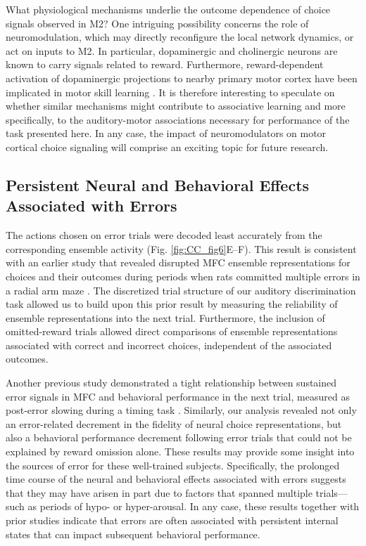 What physiological mechanisms underlie the outcome dependence of choice signals observed in M2? One intriguing possibility concerns the role of neuromodulation, which may directly reconfigure the local network dynamics, or act on inputs to M2. In particular, dopaminergic \citep{schultz1997neural} and cholinergic \citep{hangya2015central} neurons are known to carry signals related to reward. Furthermore, reward-dependent activation of dopaminergic projections to nearby primary motor cortex have been implicated in motor skill learning \citep{hosp2011dopaminergic, leemburg2018motor}. It is therefore interesting to speculate on whether similar mechanisms might contribute to associative learning \citep{takehara2008spontaneous} and more specifically, to the auditory-motor associations necessary for performance of the task presented here. In any case, the impact of neuromodulators on motor cortical choice signaling will comprise an exciting topic for future research.

\subsection*{Persistent Neural and Behavioral Effects Associated with Errors}
The actions chosen on error trials were decoded least accurately from the corresponding ensemble activity (Fig. \ref{fig:CC_fig6}E--F). This result is consistent with an earlier study that revealed disrupted MFC ensemble representations for choices and their outcomes during periods when rats committed multiple errors in a radial arm maze \citep{lapish2008successful, hyman2012action}. The discretized trial structure of our auditory discrimination task allowed us to build upon this prior result by measuring the reliability of ensemble representations into the next trial. Furthermore, the inclusion of omitted-reward trials allowed direct comparisons of ensemble representations associated with correct and incorrect choices, independent of the associated outcomes.

Another previous study demonstrated a tight relationship between sustained error signals in MFC and behavioral performance in the next trial, measured as post-error slowing during a timing task \citep{narayanan2013common}. Similarly, our analysis revealed not only an error-related decrement in the fidelity of neural choice representations, but also a behavioral performance decrement following error trials that could not be explained by reward omission alone. These results may provide some insight into the sources of error for these well-trained subjects. Specifically, the prolonged time course of the neural and behavioral effects associated with errors suggests that they may have arisen in part due to factors that spanned multiple trials---such as periods of hypo- or hyper-arousal. In any case, these results together with prior studies indicate that errors are often associated with persistent internal states that can impact subsequent behavioral performance.

